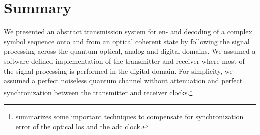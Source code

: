 \section*{Summary}

We presented an abstract transmission system for en- and decoding of a complex symbol sequence onto and from an optical coherent state by following the signal processing across the quantum-optical, analog and digital domains.
We assumed a software-defined implementation of the transmitter and receiver where most of the signal processing is performed in the digital domain.
For simplicity, we assumed a perfect noiseless quantum channel without attenuation and perfect synchronization between the transmitter and receiver clocks.\footnote{ summarizes some important techniques to compensate for synchronization error of the optical \gls{lo}s and the \gls{adc} clock.}

